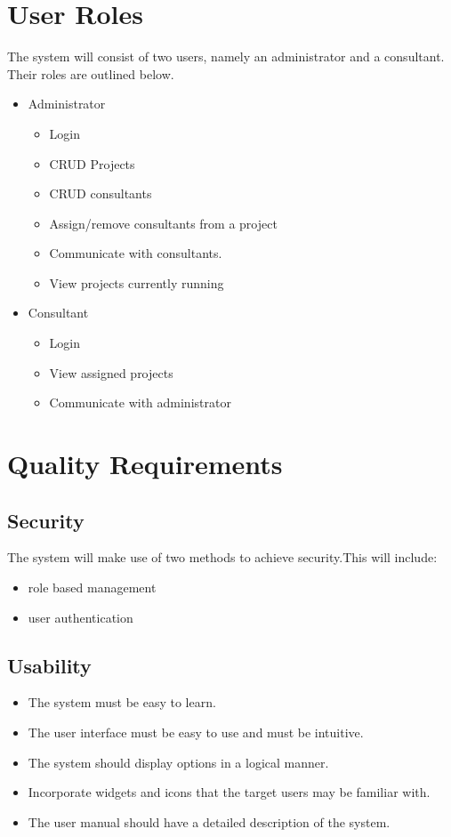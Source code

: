 \documentclass[a4paper, 12pt, oneside]{article}
\begin{document}
\section{User Roles}
The system will consist of two users, namely an administrator and a consultant. Their roles are outlined below.
\begin{itemize}
\item Administrator
\begin{itemize}
\item Login
\item CRUD Projects
\item CRUD consultants
\item Assign/remove consultants from a project
\item Communicate with consultants.
\item View projects currently running
\end{itemize}
\item Consultant
\begin{itemize}
\item Login
\item View assigned projects
\item Communicate with administrator
\end{itemize}
\end{itemize}

\section{Quality Requirements}
\subsection{Security}
The system will make use of two methods to achieve security.This will include:
\begin{itemize}
\item role based management
\item user authentication
\end{itemize}
\subsection{Usability}
\begin{itemize}
	\item The system must be easy to learn.
	\item The user interface must be easy to use and must be intuitive.
	\item The system should display options in a logical manner.
	\item Incorporate widgets and icons that the target users may be familiar with.
	\item The user manual should have a detailed description of the system.
\end{itemize}
\end{document}
